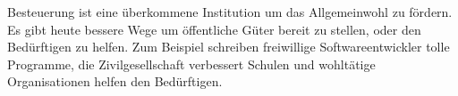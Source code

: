 Besteuerung ist eine überkommene Institution um das Allgemeinwohl zu fördern.
Es gibt heute bessere Wege um öffentliche Güter bereit zu stellen, oder den Bedürftigen zu helfen.
Zum Beispiel schreiben freiwillige Softwareentwickler tolle Programme, die Zivilgesellschaft verbessert Schulen und wohltätige Organisationen helfen den Bedürftigen.